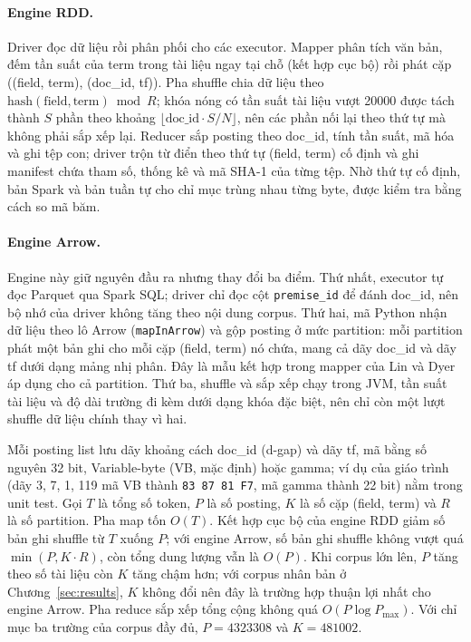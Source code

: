 \documentclass[11pt,a4paper,oneside]{report}
\newcommand{\code}[1]{\texttt{#1}}
\begin{document}
\paragraph{Engine RDD.} Driver đọc dữ liệu rồi phân phối cho các executor. Mapper phân tích văn bản, đếm tần suất của term
trong tài liệu ngay tại chỗ (kết hợp cục bộ) rồi phát cặp ((field, term), (doc\_id, tf)). Pha shuffle chia dữ liệu theo
$\mathrm{hash}(\text{field}, \text{term}) \bmod R$; khóa nóng có tần suất tài liệu vượt \num{20000} được tách thành $S$ phần
theo khoảng $\lfloor \text{doc\_id} \cdot S / N \rfloor$, nên các phần nối lại theo thứ tự mà không phải sắp xếp lại.
Reducer sắp posting theo doc\_id, tính tần suất, mã hóa và ghi tệp con; driver trộn từ điển theo thứ tự (field, term) cố
định và ghi manifest chứa tham số, thống kê và mã SHA-1 của từng tệp. Nhờ thứ tự cố định, bản Spark và bản tuần tự cho chỉ
mục trùng nhau từng byte, được kiểm tra bằng cách so mã băm.

\paragraph{Engine Arrow.} Engine này giữ nguyên đầu ra nhưng thay đổi ba điểm. Thứ nhất, executor tự đọc Parquet qua Spark
SQL; driver chỉ đọc cột \code{premise\_id} để đánh doc\_id, nên bộ nhớ của driver không tăng theo nội dung corpus. Thứ hai,
mã Python nhận dữ liệu theo lô Arrow (\code{mapInArrow}) và gộp posting ở mức partition: mỗi partition phát một bản ghi cho
mỗi cặp (field, term) nó chứa, mang cả dãy doc\_id và dãy tf dưới dạng mảng nhị phân. Đây là mẫu kết hợp trong mapper của
Lin và Dyer~\cite{lin2010} áp dụng cho cả partition. Thứ ba, shuffle và sắp xếp chạy trong JVM, tần suất tài liệu và độ dài
trường đi kèm dưới dạng khóa đặc biệt, nên chỉ còn một lượt shuffle dữ liệu chính thay vì hai.

Mỗi posting list lưu dãy khoảng cách doc\_id (d-gap) và dãy tf, mã bằng số nguyên 32 bit, Variable-byte (VB, mặc định) hoặc
gamma; ví dụ của giáo trình~\cite{manning2008} (dãy 3, 7, 1, 119 mã VB thành \code{83 87 81 F7}, mã gamma thành 22 bit) nằm
trong unit test. Gọi $T$ là tổng số token, $P$ là số posting, $K$ là số cặp (field, term) và $R$ là số partition. Pha map
tốn $O(T)$. Kết hợp cục bộ của engine RDD giảm số bản ghi shuffle từ $T$ xuống $P$; với engine Arrow, số bản ghi shuffle
không vượt quá $\min(P, K \cdot R)$, còn tổng dung lượng vẫn là $O(P)$. Khi corpus lớn lên, $P$ tăng theo số tài liệu còn
$K$ tăng chậm hơn; với corpus nhân bản ở Chương~\ref{sec:results}, $K$ không đổi nên đây là trường hợp thuận lợi nhất cho
engine Arrow. Pha reduce sắp xếp tổng cộng không quá $O(P \log P_{\max})$. Với chỉ mục ba trường của corpus đầy đủ,
$P = \num{4323308}$ và $K = \num{481002}$.
\end{document}
